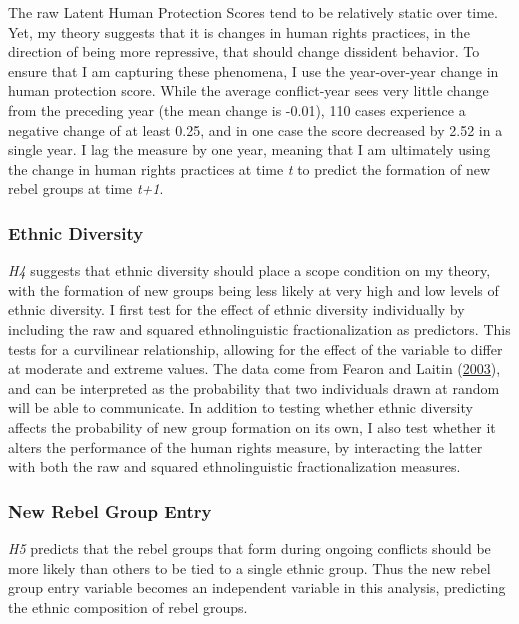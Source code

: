 \documentclass[12pt,]{book}
\theoremstyle{definition}
\theoremstyle{definition}
\theoremstyle{definition}
\theoremstyle{remark}
\begin{document}
The raw Latent Human Protection Scores tend to be relatively static over
time. Yet, my theory suggests that it is changes in human rights
practices, in the direction of being more repressive, that should change
dissident behavior. To ensure that I am capturing these phenomena, I use
the year-over-year change in human protection score. While the average
conflict-year sees very little change from the preceding year (the mean
change is -0.01), 110 cases experience a negative change of at least
0.25, and in one case the score decreased by 2.52 in a single year. I
lag the measure by one year, meaning that I am ultimately using the
change in human rights practices at time \emph{t} to predict the
formation of new rebel groups at time \emph{t+1}.

\hypertarget{ethnic-diversity}{%
\subsubsection*{Ethnic Diversity}\label{ethnic-diversity}}

\emph{H4} suggests that ethnic diversity should place a scope condition
on my theory, with the formation of new groups being less likely at very
high and low levels of ethnic diversity. I first test for the effect of
ethnic diversity individually by including the raw and squared
ethnolinguistic fractionalization as predictors. This tests for a
curvilinear relationship, allowing for the effect of the variable to
differ at moderate and extreme values. The data come from Fearon and
Laitin (\protect\hyperlink{ref-fearonlaitin03}{2003}), and can be
interpreted as the probability that two individuals drawn at random will
be able to communicate. In addition to testing whether ethnic diversity
affects the probability of new group formation on its own, I also test
whether it alters the performance of the human rights measure, by
interacting the latter with both the raw and squared ethnolinguistic
fractionalization measures.

\hypertarget{new-rebel-group-entry}{%
\subsubsection*{New Rebel Group Entry}\label{new-rebel-group-entry}}

\emph{H5} predicts that the rebel groups that form during ongoing
conflicts should be more likely than others to be tied to a single
ethnic group. Thus the new rebel group entry variable becomes an
independent variable in this analysis, predicting the ethnic composition
of rebel groups.
\end{document}
